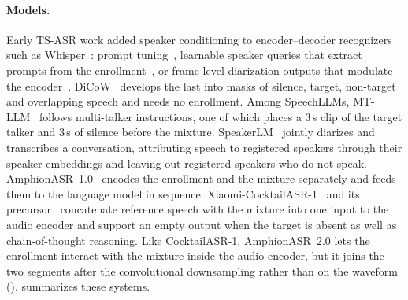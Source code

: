\paragraph{Models.}
Early TS-ASR work added speaker conditioning to encoder--decoder recognizers such as Whisper~\cite{radford2023robust}: prompt tuning~\cite{ma2023extending}, learnable speaker queries that extract prompts from the enrollment~\cite{guo2024sqwhisper}, or frame-level diarization outputs that modulate the encoder~\cite{polok2024target}.
DiCoW~\cite{polok2024dicow} develops the last into masks of silence, target, non-target and overlapping speech and needs no enrollment.
Among SpeechLLMs, MT-LLM~\cite{meng2024large} follows multi-talker instructions, one of which places a 3\,s clip of the target talker and 3\,s of silence before the mixture.
SpeakerLM~\cite{yin2025speakerlm} jointly diarizes and transcribes a conversation, attributing speech to registered speakers through their speaker embeddings and leaving out registered speakers who do not speak.
AmphionASR~1.0~\cite{amphion2026amphionasr} encodes the enrollment and the mixture separately and feeds them to the language model in sequence.
Xiaomi-CocktailASR-1~\cite{zhang2026xiaomi} and its precursor~\cite{zhang2025thinking} concatenate reference speech with the mixture into one input to the audio encoder and support an empty output when the target is absent as well as chain-of-thought reasoning.
Like CocktailASR-1, AmphionASR~2.0 lets the enrollment interact with the mixture inside the audio encoder, but it joins the two segments after the convolutional downsampling rather than on the waveform ().
 summarizes these systems.

